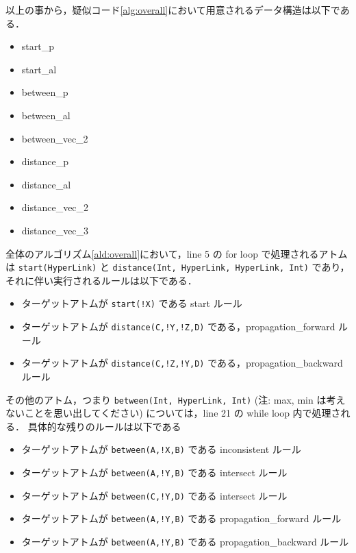 以上の事から，疑似コード\ref{alg:overall}において用意されるデータ構造は以下である．
\begin{itemize}
    \item start\_p
    \item start\_al
    \item between\_p
    \item between\_al
    \item between\_vec\_2
    \item distance\_p
    \item distance\_al
    \item distance\_vec\_2
    \item distance\_vec\_3
\end{itemize}

全体のアルゴリズム\ref{ald:overall}において，line 5 の for loop で処理されるアトムは \texttt{start(HyperLink)} と \texttt{distance(Int, HyperLink, HyperLink, Int)} であり，
それに伴い実行されるルールは以下である．
\begin{itemize}
    \item ターゲットアトムが \texttt{start(!X)} である start ルール
    \item ターゲットアトムが \texttt{distance(C,!Y,!Z,D)} である，propagation\_forward ルール
    \item ターゲットアトムが \texttt{distance(C,!Z,!Y,D)} である，propagation\_backward ルール
\end{itemize}
その他のアトム，つまり \texttt{between(Int, HyperLink, Int)} (注: max, min は考えないことを思い出してください)
については，line 21 の while loop 内で処理される．
具体的な残りのルールは以下である
\begin{itemize}
    \item ターゲットアトムが \texttt{between(A,!X,B)} である inconsistent ルール
    \item ターゲットアトムが \texttt{between(A,!Y,B)} である intersect ルール
    \item ターゲットアトムが \texttt{between(C,!Y,D)} である intersect ルール
    \item ターゲットアトムが \texttt{between(A,!Y,B)} である propagation\_forward ルール
    \item ターゲットアトムが \texttt{between(A,!Y,B)} である propagation\_backward ルール
\end{itemize}


